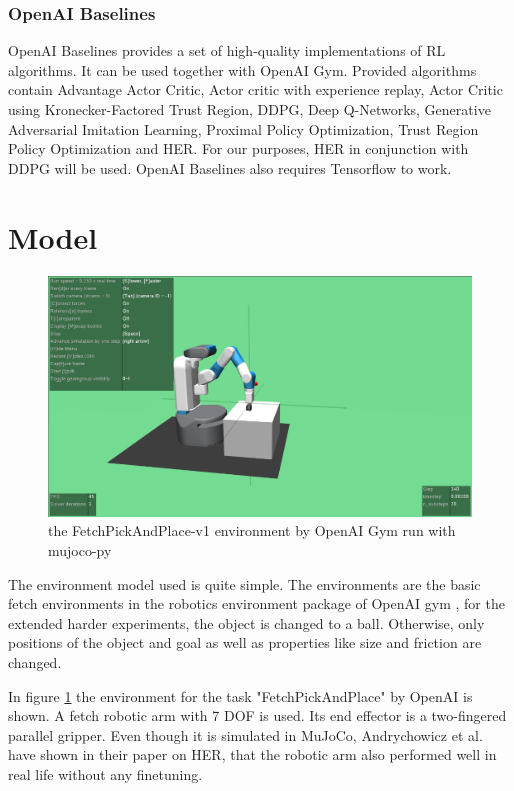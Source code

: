 \subsubsection{OpenAI Baselines}
OpenAI Baselines provides a set of high-quality implementations of RL algorithms. It can be used together with OpenAI Gym. Provided algorithms contain Advantage Actor Critic, Actor critic with experience replay, Actor Critic using Kronecker-Factored Trust Region, DDPG, Deep Q-Networks, Generative Adversarial Imitation Learning, Proximal Policy Optimization, Trust Region Policy Optimization and HER.
For our purposes, HER in conjunction with DDPG will be used. 
OpenAI Baselines also requires Tensorflow to work.

\section{Model}

\begin{figure} [h]
	\centering
	\includegraphics[width=1\textwidth]{figures/FetchPickAndPlace-v1.pdf}
	\caption{the FetchPickAndPlace-v1 environment by OpenAI Gym run with mujoco-py}
	\label{pickplace1}
\end{figure}

The environment model used is quite simple. The environments are the basic fetch environments in the robotics environment package of OpenAI gym \cite{plappert}, for the extended harder experiments, the object is changed to a ball. Otherwise, only positions of the object and goal as well as properties like size and friction are changed.

\vspace{0.5cm}

In figure \ref{pickplace1} the environment for the task "FetchPickAndPlace" by OpenAI is shown. A fetch robotic arm with 7 DOF is used. Its end effector is a two-fingered parallel gripper. Even though it is simulated in MuJoCo, Andrychowicz et al. have shown in their paper on HER, that the robotic arm also performed well in real life without any finetuning. \cite{herpaper}

